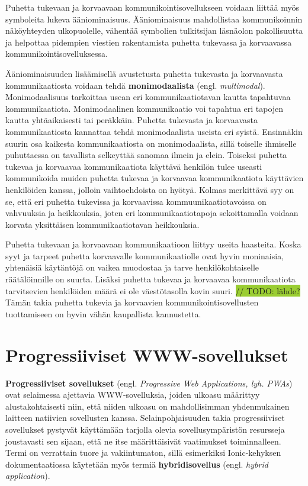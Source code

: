 \documentclass[utf8]{gradu3}
\begin{document}
Puhetta tukevaan ja korvaavaan kommunikointisovellukseen voidaan liittää myös symboleita lukeva ääniominaisuus. Ääniominaisuus mahdollistaa kommunikoinnin näköyhteyden ulkopuolelle, vähentää symbolien tulkitsijan läsnäolon pakollisuutta ja helpottaa pidempien viestien rakentamista puhetta tukevassa ja korvaavassa kommunikointisovelluksessa. \parencite[]{AAC-interventions}

Ääniominaisuuden lisäämisellä avustetusta puhetta tukevasta ja korvaavasta kommunikaatiosta voidaan tehdä \textbf{monimodaalista} (engl. \textit{multimodal}). Monimodaalisuus tarkoittaa usean eri kommunikaatiotavan kautta tapahtuvaa kommunikaatiota. Monimodaalinen kommunikaatio voi tapahtua eri tapojen kautta yhtäaikaisesti tai peräkkäin. Puhetta tukevasta ja korvaavasta kommunikaatiosta kannattaa tehdä monimodaalista useista eri syistä. Ensinnäkin suurin osa kaikesta kommunikaatiosta on monimodaalista, sillä toiselle ihmiselle puhuttaessa on tavallista selkeyttää sanomaa ilmein ja elein. Toiseksi puhetta tukevaa ja korvaavaa kommunikaatiota käyttävä henkilön tulee useasti kommunikoida muiden puhetta tukevaa ja korvaavaa kommunikaatiota käyttävien henkilöiden kanssa, jolloin vaihtoehdoista on hyötyä. Kolmas merkittävä syy on se, että eri puhetta tukevissa ja korvaavissa kommuunikaatiotavoissa on vahvuuksia ja heikkouksia, joten eri kommunikaatiotapoja sekoittamalla voidaan korvata yksittäisen kommunikaatiotavan heikkouksia. \parencite[]{AAC-conditional-use}

Puhetta tukevaan ja korvaavaan kommunikaatioon liittyy useita haasteita. Koska syyt ja tarpeet puhetta korvaavalle kommunikaatiolle ovat hyvin moninaisia, yhtenäisiä käytäntöjä on vaikea muodostaa ja tarve henkilökohtaiselle räätälöinnille on suurta. Lisäksi puhetta tukevaa ja korvaavaa kommunikaatiota tarvitsevien henkilöiden määrä ei ole väestötasolla kovin suuri. \colorbox{YellowGreen}{// TODO: lähde?} Tämän takia puhetta tukevia ja korvaavien kommunikointisovellusten tuottamiseen on hyvin vähän kaupallista kannustetta.

\section{Progressiiviset WWW-sovellukset}

\textbf{Progressiiviset sovellukset} (engl. \textit{Progressive Web Applications, lyh. PWAs}) ovat selaimessa ajettavia WWW-sovelluksia, joiden ulkoasu määrittyy alustakohtaisesti niin, että niiden ulkoasu on mahdollisimman yhdenmukainen laitteen natiivien sovellusten kanssa. Selainpohjaisuuden takia progressiiviset sovellukset pystyvät käyttämään tarjolla olevia sovellusympäristön resursseja joustavasti sen sijaan, että ne itse määrittäisivät vaatimukset toiminnalleen. Termi on verrattain tuore ja vakiintumaton, sillä esimerkiksi Ionic-kehyksen dokumentaatiossa käytetään myös termiä \textbf{hybridisovellus} (engl. \textit{hybrid application}).
\end{document}

